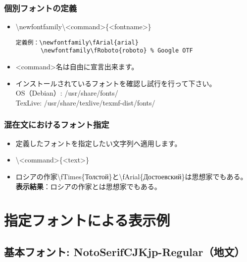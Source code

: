 \documentclass[a4paper,10pt]{ltjsarticle}
\def\colH#1{\color[HTML]{#1}}
\begin{document}

\subsubsection{個別フォントの定義}
\begin{itemize}
  \item[] {\colH{800000} \textbackslash newfontfamily\textbackslash<command>\{<fontname>\}}
\vspace{-2mm}
\begin{verbatim}
定義例：\newfontfamily\fArial{arial}
       \newfontfamily\fRoboto{roboto} % Google OTF
\end{verbatim} 
\vspace{-2mm}
  \item <command>名は自由に宣言出来ます。  
  \item インストールされているフォントを確認し試行を行って下さい。\\
OS（Debian）: /usr/share/fonts/\\
TexLive: /usr/share/texlive/texmf-dist/fonts/\vspace{-4mm}
\end{itemize}

\subsubsection{混在文におけるフォント指定}
\begin{itemize}
  \item 定義したフォントを指定したい文字列へ適用します。
  \item[] {\colH{800000} \textbackslash <command>\{<text>\}}
  \item[] ロシアの作家{\colH{800000}\textbackslash fTimes\{}Толстой{\colH{800000}\}}と{\colH{800000}\textbackslash fArial\{}Достоевский{\colH{800000}\}}は思想家でもある。\\
    \textbf{表示結果}：ロシアの作家とは思想家でもある。
\end{itemize}

\section{指定フォントによる表示例}
\subsection{基本フォント: \textcolor{rred}{NotoSerifCJKjp-Regular}（地文）}
\end{document}
